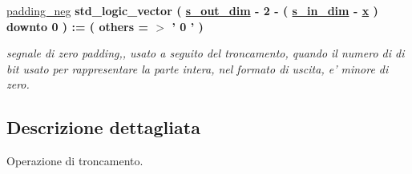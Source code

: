 \begin{DoxyCompactItemize}
\hyperlink{group___truncation_ga130836df2917c4b75d1fc24500082e76}{padding\+\_\+neg} {\bfseries \textcolor{vhdlchar}{std\+\_\+logic\+\_\+vector}\textcolor{vhdlchar}{ }\textcolor{vhdlchar}{(}\textcolor{vhdlchar}{ }\textcolor{vhdlchar}{ }\textcolor{vhdlchar}{ }\textcolor{vhdlchar}{ }{\bfseries \hyperlink{group___truncation_ga8b62f8bfecb0fab845995b8b051101bc}{s\+\_\+out\+\_\+dim}} \textcolor{vhdlchar}{-\/}\textcolor{vhdlchar}{ } \textcolor{vhdldigit}{2} \textcolor{vhdlchar}{-\/}\textcolor{vhdlchar}{ }\textcolor{vhdlchar}{(}\textcolor{vhdlchar}{ }\textcolor{vhdlchar}{ }\textcolor{vhdlchar}{ }\textcolor{vhdlchar}{ }{\bfseries \hyperlink{group___truncation_gad3d18243ad6fe53a2277e2aa9b94ca45}{s\+\_\+in\+\_\+dim}} \textcolor{vhdlchar}{-\/}\textcolor{vhdlchar}{ }\textcolor{vhdlchar}{ }\textcolor{vhdlchar}{ }{\bfseries \hyperlink{group___truncation_ga63701d8af27da7452a7588efcff357bc}{x}} \textcolor{vhdlchar}{ }\textcolor{vhdlchar}{)}\textcolor{vhdlchar}{ }\textcolor{vhdlchar}{ }\textcolor{vhdlchar}{downto}\textcolor{vhdlchar}{ }\textcolor{vhdlchar}{ } \textcolor{vhdldigit}{0} \textcolor{vhdlchar}{ }\textcolor{vhdlchar}{)}\textcolor{vhdlchar}{ }\textcolor{vhdlchar}{ }\textcolor{vhdlchar}{ }\textcolor{vhdlchar}{\+:}\textcolor{vhdlchar}{=}\textcolor{vhdlchar}{ }\textcolor{vhdlchar}{(}\textcolor{vhdlchar}{ }\textcolor{vhdlchar}{ }\textcolor{vhdlchar}{others}\textcolor{vhdlchar}{ }\textcolor{vhdlchar}{ }\textcolor{vhdlchar}{=}\textcolor{vhdlchar}{ }\textcolor{vhdlchar}{$>$}\textcolor{vhdlchar}{ }\textcolor{vhdlchar}{'}\textcolor{vhdlchar}{ } \textcolor{vhdldigit}{0} \textcolor{vhdlchar}{ }\textcolor{vhdlchar}{'}\textcolor{vhdlchar}{ }\textcolor{vhdlchar}{)}\textcolor{vhdlchar}{ }} 
\begin{DoxyCompactList}\small\item\em segnale di zero padding,, usato a seguito del troncamento, quando il numero di di bit usato per rappresentare la parte intera, nel formato di uscita, e' minore di zero. \end{DoxyCompactList}\end{DoxyCompactItemize}


\subsection{Descrizione dettagliata}
Operazione di troncamento. 




